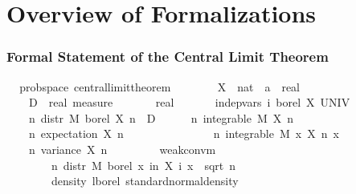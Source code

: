 \documentclass{beamer}
\begin{document}
\section{Overview of Formalizations}

\begin{frame}
\frametitle{Formal Statement of the Central Limit Theorem}
\begin{isabellebody}
\isamarkupfalse%
\ {\isacharparenleft}\,\ prob{\isacharunderscore}space{\isacharparenright}\ central{\isacharunderscore}limit{\isacharunderscore}theorem{\isacharcolon}\isanewline
\ \ \ \isanewline
\ \ \ \ X\ {\isacharcolon}{\isacharcolon}\ {\isachardoublequoteopen}nat\ {\isasymRightarrow}\ {\isacharprime}a\ {\isasymRightarrow}\ real{\isachardoublequoteclose}\ \isanewline
\ \ \ \ D\ {\isacharcolon}{\isacharcolon}\ {\isachardoublequoteopen}real\ measure{\isachardoublequoteclose}\ \isanewline
\ \ \ \ {\isasymsigma}\ {\isacharcolon}{\isacharcolon}\ real\isanewline
\pause
\ \ \isanewline
\ \ \ \ {\isachardoublequoteopen}indep{\isacharunderscore}vars\ {\isacharparenleft}{\isasymlambda}i{\isachardot}\ borel{\isacharparenright}\ X\ UNIV{\isachardoublequoteclose}\ \isanewline
\ \ \ \ {\isachardoublequoteopen}{\isasymAnd}n{\isachardot}\ {distr}\ M\ borel\ {\isacharparenleft}X\ n{\isacharparenright}\ {\isacharequal}\ D{\isachardoublequoteclose}
\pause\ \isanewline
\ \ \ \ {\isachardoublequoteopen}{\isasymAnd}n{\isachardot}\ integrable\ M\ {\isacharparenleft}X\ n{\isacharparenright}{\isachardoublequoteclose}\ \isanewline
\ \ \ \ {\isachardoublequoteopen}{\isasymAnd}n{\isachardot}\ expectation\ {\isacharparenleft}X\ n{\isacharparenright}\ {\isacharequal}\ {}{\isachardoublequoteclose}
\pause\ \isanewline
\ \ \ \ {\isachardoublequoteopen}{\isasymsigma}\ {\isachargreater}\ {}{\isachardoublequoteclose}\ \isanewline
\ \ \ \ {\isachardoublequoteopen}{\isasymAnd}n{\isachardot}\ integrable\ M\ {\isacharparenleft}{\isasymlambda}x{\isachardot}\ {\isacharparenleft}X\ n\ x{\isacharparenright}\ \isanewline
\ \ \ \ {\isachardoublequoteopen}{\isasymAnd}n{\isachardot}\ variance\ {\isacharparenleft}X\ n{\isacharparenright}\ {\isacharequal}\ {\isasymsigma}\isanewline
\pause
\ \ \isanewline
\ \ \ \ {\isachardoublequoteopen}weak{\isacharunderscore}conv{\isacharunderscore}m\ \isanewline
\ \ \ \ \ \ \ \ {\isacharparenleft}{\isasymlambda}n{\isachardot}\ {distr}\ M\ {borel}\ {\isacharparenleft}{\isasymlambda}x{\isachardot}\ {\isasymSum}i{\isacharless}n{\isachardot}\ X\ i\ x\ {\isacharslash}\ sqrt\ {\isacharparenleft}n\ {\isacharasterisk}\ {\isasymsigma}\isanewline
\ \ \ \ \ \ \ \ {\isacharparenleft}{density}\ {lborel}\ standard{\isacharunderscore}normal{\isacharunderscore}density{\isacharparenright}{\isachardoublequoteclose}
\end{isabellebody}
\end{frame}
\end{document}
